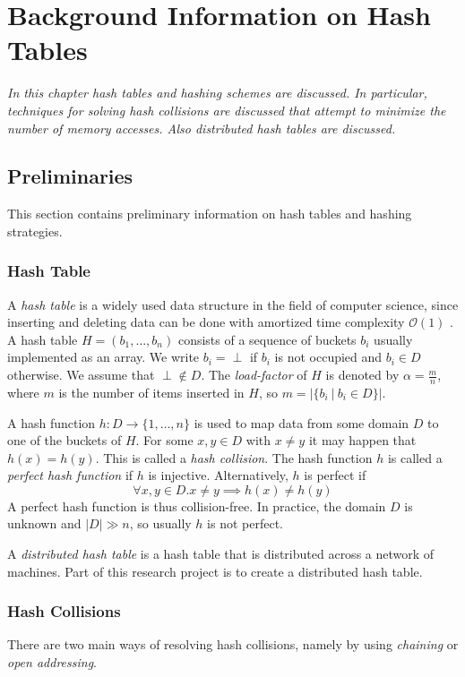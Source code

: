 \chapter{Background Information on Hash Tables}

\textit{In this chapter hash tables and hashing schemes are discussed. In particular, techniques for solving hash collisions are discussed that attempt to minimize the number of memory accesses. Also distributed hash tables are discussed.}

\section{Preliminaries}
This section contains preliminary information on hash tables and hashing strategies.

\subsection{Hash Table}
A \emph{hash table} is a widely used data structure in the field of computer science, since inserting and deleting data can be done with amortized time complexity $\mathcal{O}(1)$ \cite{DBLP:conf/vldb/Litwin80}. A hash table $H = (b_1, \dots, b_n)$ consists of a sequence of buckets $b_i$ usually implemented as an array. We write $b_i = \perp$ if $b_i$ is not occupied and $b_i \in D$ otherwise. We assume that $\perp \not \in D$. The \emph{load-factor} of $H$ is denoted by $\alpha = \frac{m}{n}$, where $m$ is the number of items inserted in $H$, so $m = |\{ b_i \ | \ b_i \in D \}|$.

A hash function $h : D \rightarrow \{ 1, \dots, n \}$ is used to map data from some domain $D$ to one of the buckets of $H$. For some $x,y \in D$ with $x \not = y$ it may happen that $h(x) = h(y)$. This is called a \emph{hash collision}. The hash function $h$ is called a \emph{perfect hash function} if $h$ is injective. Alternatively, $h$ is perfect if $$\forall x, y \in D. x \not = y \implies h(x) \not = h(y)$$ A perfect hash function is thus collision-free. In practice, the domain $D$ is unknown and $|D| \gg n$, so usually $h$ is not perfect. 

A \emph{distributed hash table} is a hash table that is distributed across a network of machines. Part of this research project is to create a distributed hash table.

\subsection{Hash Collisions}
There are two main ways of resolving hash collisions, namely by using \emph{chaining} or \emph{open addressing}. 

